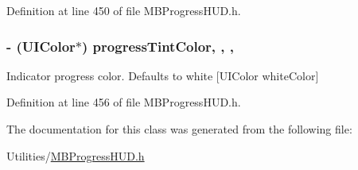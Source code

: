 Definition at line 450 of file M\+B\+Progress\+H\+U\+D.\+h.

\hypertarget{interface_m_b_round_progress_view_ae5c8d76a85810a3f843f262bdfff1163}{
\subsubsection[{progress\+Tint\+Color}]{\setlength{\rightskip}{0pt plus 5cm}-\/ (U\+I\+Color$\ast$) progress\+Tint\+Color\hspace{0.3cm}{\ttfamily [read]}, {\ttfamily [write]}, {\ttfamily [nonatomic]}, {\ttfamily [assign]}}}\label{interface_m_b_round_progress_view_ae5c8d76a85810a3f843f262bdfff1163}
Indicator progress color. Defaults to white \mbox{[}U\+I\+Color white\+Color\mbox{]} 

Definition at line 456 of file M\+B\+Progress\+H\+U\+D.\+h.



The documentation for this class was generated from the following file\+:\begin{DoxyCompactItemize}
\item 
Utilities/\hyperlink{_m_b_progress_h_u_d_8h}{M\+B\+Progress\+H\+U\+D.\+h}\end{DoxyCompactItemize}
